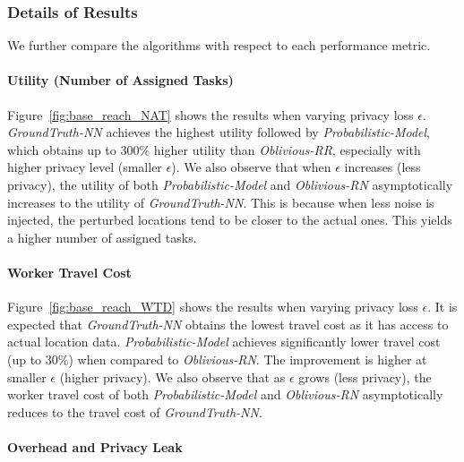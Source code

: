 \documentclass{USC-Thesis}
\numberwithin{equation}{chapter}
\begin{document}
\subsubsection{Details of Results}

We further compare the algorithms with respect to each performance metric.

\paragraph{Utility (Number of Assigned Tasks)}

Figure~\ref{fig:base_reach_NAT} shows the results when varying privacy loss $\epsilon$. 
\emph{GroundTruth-NN} achieves the highest utility followed by \emph{Probabilistic-Model}, which obtains up to 300\% higher utility than \emph{Oblivious-RR}, especially with higher privacy level (smaller $\epsilon$).
We also observe that when $\epsilon$ increases (less privacy), the utility of both \emph{Probabilistic-Model} and \emph{Oblivious-RN} asymptotically increases to the utility of \emph{GroundTruth-NN}. This is because when less noise is injected, the perturbed locations tend to be closer to the actual ones.
This yields a higher number of assigned tasks.

\paragraph{Worker Travel Cost}

Figure~\ref{fig:base_reach_WTD} shows the results when varying privacy loss $\epsilon$.
It is expected that \emph{GroundTruth-NN} obtains the lowest travel cost as it has access to actual location data.
\emph{Probabilistic-Model} achieves significantly lower travel cost (up to 30\%) when compared to \emph{Oblivious-RN}. The improvement is higher at smaller $\epsilon$ (higher privacy).
We also observe that as $\epsilon$ grows (less privacy), the worker travel cost of both \emph{Probabilistic-Model} and \emph{Oblivious-RN} asymptotically reduces to the travel cost of \emph{GroundTruth-NN}. 

\paragraph{Overhead and Privacy Leak}
\end{document}
